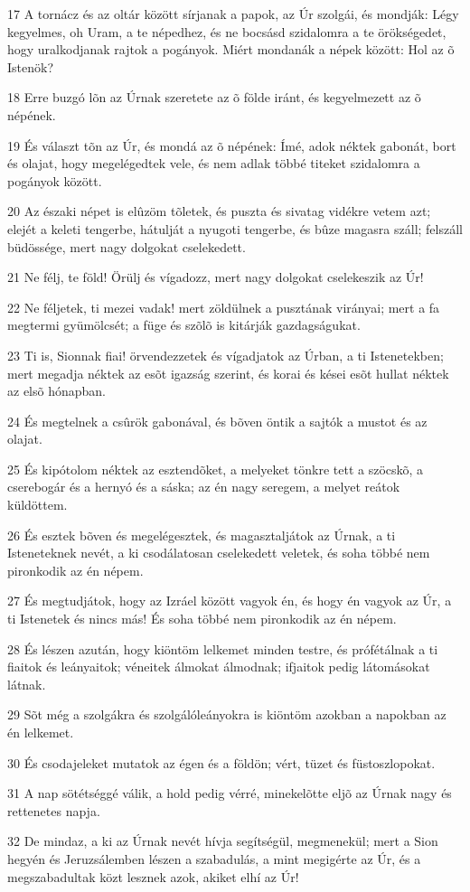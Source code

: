\par 17 A tornácz és az oltár között sírjanak a papok, az Úr szolgái, és mondják: Légy kegyelmes, oh Uram, a te népedhez, és ne bocsásd szidalomra a te örökségedet, hogy uralkodjanak rajtok a pogányok. Miért mondanák a népek között: Hol az õ Istenök?
\par 18 Erre buzgó lõn az Úrnak szeretete az õ földe iránt, és kegyelmezett az õ népének.
\par 19 És választ tõn az Úr, és mondá az õ népének: Ímé, adok néktek gabonát, bort és olajat, hogy megelégedtek vele, és nem adlak többé titeket szidalomra a pogányok között.
\par 20 Az északi népet is elûzöm tõletek, és puszta és sivatag vidékre vetem azt; elejét a keleti tengerbe, hátulját a nyugoti tengerbe, és bûze magasra száll; felszáll büdössége, mert nagy dolgokat cselekedett.
\par 21 Ne félj, te föld! Örülj és vígadozz, mert nagy dolgokat cselekeszik az Úr!
\par 22 Ne féljetek, ti mezei vadak! mert zöldülnek a pusztának virányai; mert a fa megtermi gyümölcsét; a füge és szõlõ is kitárják gazdagságukat.
\par 23 Ti is, Sionnak fiai! örvendezzetek és vígadjatok az Úrban, a ti Istenetekben; mert megadja néktek az esõt igazság szerint, és korai és kései esõt hullat néktek az elsõ hónapban.
\par 24 És megtelnek a csûrök gabonával, és bõven öntik a sajtók a mustot és az olajat.
\par 25 És kipótolom néktek az esztendõket, a melyeket tönkre tett a szöcskõ, a cserebogár és a hernyó és a sáska; az én nagy seregem, a melyet reátok küldöttem.
\par 26 És esztek bõven és megelégesztek, és magasztaljátok az Úrnak, a ti Isteneteknek nevét, a ki csodálatosan cselekedett veletek, és soha többé nem pironkodik az én népem.
\par 27 És megtudjátok, hogy az Izráel között vagyok én, és hogy én vagyok az Úr, a ti Istenetek és nincs más! És soha többé nem pironkodik az én népem.
\par 28 És lészen azután, hogy kiöntöm lelkemet minden testre, és prófétálnak a ti fiaitok és leányaitok; véneitek álmokat álmodnak; ifjaitok pedig látomásokat látnak.
\par 29 Sõt még a szolgákra és szolgálóleányokra is kiöntöm azokban a napokban az én lelkemet.
\par 30 És csodajeleket mutatok az égen és a földön; vért, tüzet és füstoszlopokat.
\par 31 A nap sötétséggé válik, a hold pedig vérré, minekelõtte eljõ az Úrnak nagy és rettenetes napja.
\par 32 De mindaz, a ki az Úrnak nevét hívja segítségül, megmenekül; mert a Sion hegyén és Jeruzsálemben lészen a szabadulás, a mint megigérte az Úr, és a megszabadultak  közt lesznek azok, akiket elhí az Úr!

